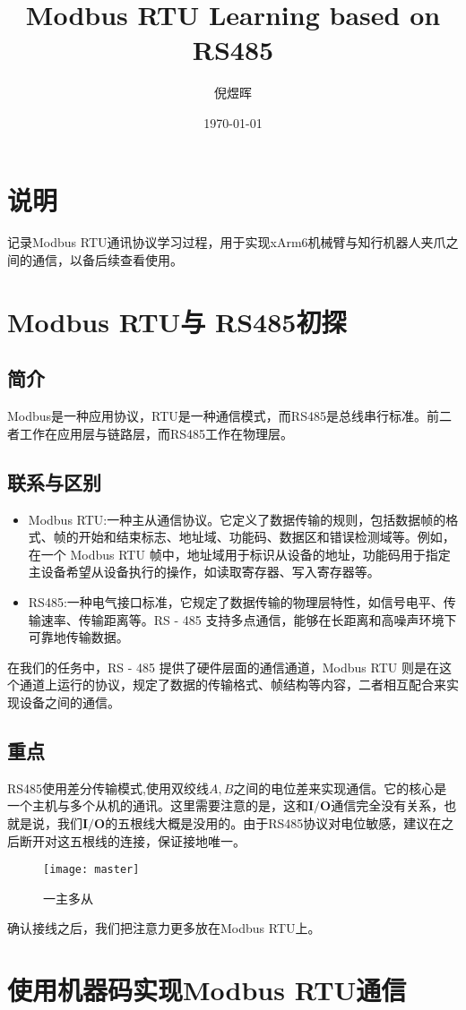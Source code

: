 \documentclass[UTF8]{ctexart}
\title{Modbus RTU Learning based on RS485}
\author{倪煜晖}
\date{\today}
\begin{document}
\maketitle

\tableofcontents

\section{说明}
记录Modbus RTU通讯协议学习过程，用于实现xArm6机械臂与知行机器人夹爪之间的通信，以备后续查看使用。

\section{Modbus RTU与 RS485初探}

\subsection{简介}
Modbus是一种应用协议，RTU是一种通信模式，而RS485是总线串行标准。前二者工作在应用层与链路层，而RS485工作在物理层。

\subsection{联系与区别}
\begin{itemize}
    \item Modbus RTU:一种主从通信协议。它定义了数据传输的规则，包括数据帧的格式、帧的开始和结束标志、地址域、功能码、数据区和错误检测域等。例如，在一个 Modbus RTU 帧中，地址域用于标识从设备的地址，功能码用于指定主设备希望从设备执行的操作，如读取寄存器、写入寄存器等。
    \item RS485:一种电气接口标准，它规定了数据传输的物理层特性，如信号电平、传输速率、传输距离等。RS - 485 支持多点通信，能够在长距离和高噪声环境下可靠地传输数据。
\end{itemize}

在我们的任务中，RS - 485 提供了硬件层面的通信通道，Modbus RTU 则是在这个通道上运行的协议，规定了数据的传输格式、帧结构等内容，二者相互配合来实现设备之间的通信。

\subsection{重点}
RS485使用差分传输模式,使用双绞线$A,B$之间的电位差来实现通信。它的核心是一个主机与多个从机的通讯。这里需要注意的是，这和$\textbf{I/O}$通信完全没有关系，也就是说，我们$\textbf{I/O}$的五根线大概是没用的。由于RS485协议对电位敏感，建议在之后断开对这五根线的连接，保证接地唯一。


\begin{figure}[htbp]
    \centering
    \texttt{[image: master]}
    \caption{一主多从}
    \label{ms}
\end{figure}
确认接线之后，我们把注意力更多放在Modbus RTU上。


\section{使用机器码实现Modbus RTU通信}
\end{document}
